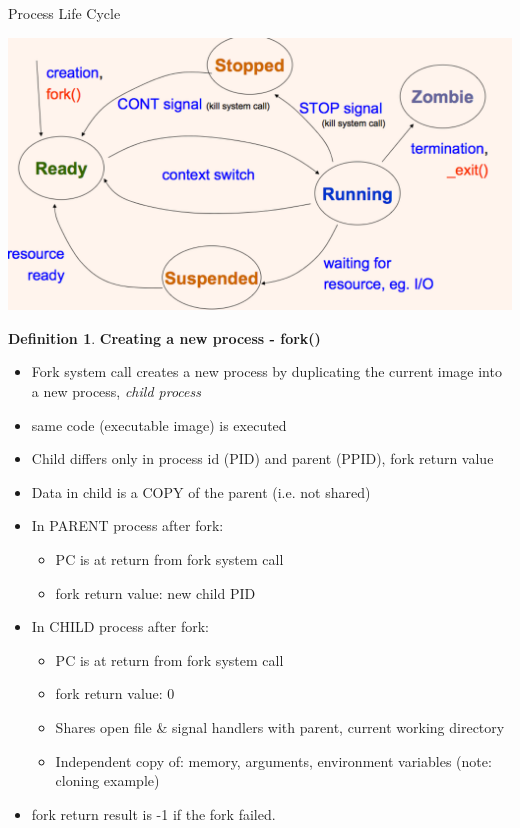 \documentclass[12pt,a4paper]{article}
\theoremstyle{definition}
\newtheorem{definition}{Definition}[section]
\newenvironment{myitemize}
{ \begin{itemize}
    \setlength{\itemsep}{5pt}
    \setlength{\parskip}{0pt}
    \setlength{\parsep}{0pt}     }
{ \end{itemize}                  }
\begin{document}
\begin{tcolorbox}
	\textsf{Process Life Cycle}
	
	\includegraphics[scale=0.3]{m1/processLifeCycle}
	\centering
\end{tcolorbox}

\begin{definition}{\textbf{Creating a new process - fork()}}
	\begin{myitemize}
		\item Fork system call creates a new process by duplicating the current image into a new process, \textit{child process}
		\item \textsf{same code} (executable image) is executed
		\item Child differs only in process id (PID) and parent (PPID), fork return value
		\item Data in child is a COPY of the parent (i.e. not shared)
		\item In PARENT process after fork:
		\begin{myitemize}
			\item PC is at return from fork system call
			\item fork return value: new child PID
		\end{myitemize}
		\item In CHILD process after fork:
		\begin{myitemize}
			\item PC is at return from fork system call
			\item fork return value: 0
			\item Shares open file \& signal handlers with parent, current working directory
			\item Independent copy of: memory, arguments, environment variables (note: cloning example)
		\end{myitemize}
		\item fork return result is -1 if the fork failed.
	\end{myitemize}
\end{definition}
\end{document}
